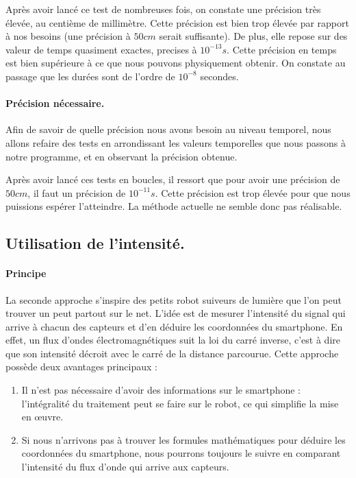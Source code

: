 Après avoir lancé ce test de nombreuses fois, on constate une précision très élevée, au centième de millimètre. Cette précision est bien trop élevée par rapport à nos besoins (une précision à $50cm$ serait suffisante). De plus, elle repose sur des valeur de temps quasiment exactes, precises à $10^{-13}s$. Cette précision en temps est bien supérieure à ce que nous pouvons physiquement obtenir. On constate au passage que les durées sont de l'ordre de $10^{-8}$ secondes.

\paragraph{Précision nécessaire.}
Afin de savoir de quelle précision nous avons besoin au niveau temporel, nous allons refaire des tests en arrondissant les valeurs temporelles que nous passons à notre programme, et en observant la précision obtenue.

Après avoir lancé ces tests en boucles, il ressort que pour avoir une précision de $50cm$, il faut un précision de $10^{-11}s$. Cette précision est trop élevée pour que nous puissions espérer l'atteindre. La méthode actuelle ne semble donc pas réalisable.

\subsection{Utilisation de l'intensité.}
\paragraph{Principe} La seconde approche s'inspire des petits robot suiveurs de lumière que l'on peut trouver un peut partout sur le net. L'idée est de mesurer l'intensité du signal qui arrive à chacun des capteurs et d'en déduire les coordonnées du smartphone. En effet, un flux d'ondes électromagnétiques suit la loi du carré inverse, c'est à dire que son intensité décroit avec le carré de la distance parcourue. Cette approche possède deux avantages principaux : \begin{enumerate}
    \item Il n'est pas nécessaire d'avoir des informations sur le smartphone : l'intégralité du traitement peut se faire sur le robot, ce qui simplifie la mise en œuvre.
    \item Si nous n'arrivons pas à trouver les formules mathématiques pour déduire les coordonnées du smartphone, nous pourrons toujours le suivre en comparant l'intensité du flux d'onde qui arrive aux capteurs.
\end{enumerate}

